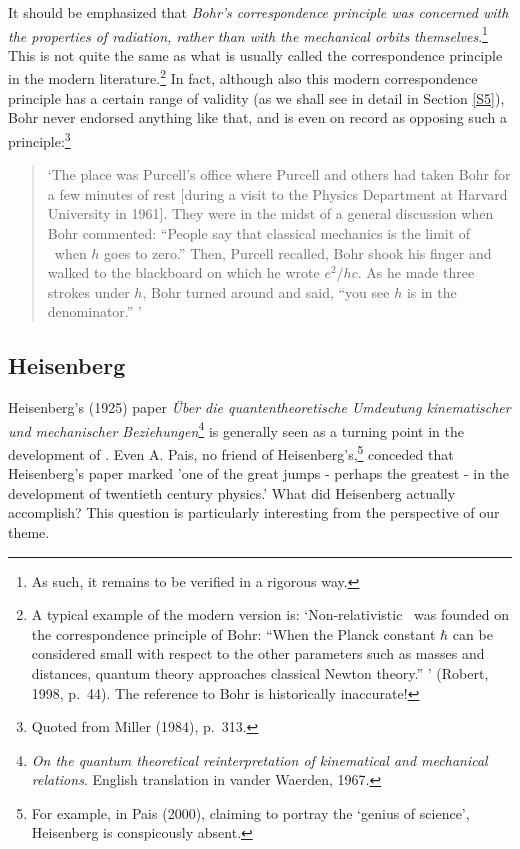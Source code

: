 \documentclass[12pt]{article}
\begin{document}
It should be emphasized that {\it Bohr's correspondence principle was concerned with the properties of radiation, rather than with the mechanical orbits themselves}.\footnote{As such, it remains to be verified in a rigorous way.}
This  is not quite  the same as what is usually called the correspondence principle in the modern literature.\footnote{A typical example of the modern version is:  `Non-relativistic \qm\ was founded on the correspondence principle of Bohr: ``When the Planck constant $\hbar$ can be considered small with respect to the other parameters such as masses and distances, quantum theory approaches classical Newton theory.'' '  (Robert, 1998, p.\ 44). The reference to Bohr is historically inaccurate!} In fact, although also this modern correspondence principle has a certain range of validity (as we shall see in detail in Section \ref{S5}), Bohr never endorsed anything like that, and is even on record as opposing such a principle:\footnote{Quoted from Miller (1984), p.\ 313.}
\begin{quote}
`The place was Purcell's office where Purcell and others had taken Bohr for a few minutes of rest [during a visit to the Physics Department at Harvard University in 1961]. They were in the midst of a general discussion when Bohr commented: ``People say that classical mechanics is the limit of \qm\ when $h$ goes to zero.'' Then, Purcell recalled, Bohr shook his finger and walked to the blackboard on which he wrote $e^2/hc$. As he made three strokes under $h$, Bohr turned around and said, ``you see $h$ is in the denominator.'' '  
\end{quote} 
\subsection{Heisenberg}\label{heis}
Heisenberg's (1925) paper \textit{\"{U}ber die quantentheoretische Umdeutung kinematischer und mechanischer Beziehungen}\footnote{\textit{On the quantum theoretical reinterpretation of kinematical and mechanical relations}.  English translation in  vander Waerden, 1967.} is generally seen as a turning point in the development of \qm. Even A. Pais, no friend of Heisenberg's,\footnote{For example, in Pais (2000), claiming to portray the `genius of science', Heisenberg is conspicously absent.}  conceded that  Heisenberg's paper marked  'one of the great jumps - perhaps the greatest - in the development of twentieth century physics.' What did Heisenberg actually accomplish? This question is particularly interesting from the perspective of our theme.
\end{document}
